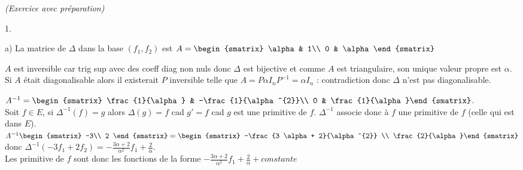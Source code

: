 \documentclass[11pt]{article}%
\begin{document}
\begin{exercice}{\it (Exercice avec préparation)}
\begin{noliste}{1.}
\begin{noliste}{a)}
 La matrice de $\Delta$ dans la base $(f_{1},f_{2})$ est $A =
\begin{smatrix}
\alpha & 1\\
0 & \alpha
\end{smatrix}
$
 \item $A$ est inversible car trig sup avec des coeff diag non nuls
donc $\Delta$ est bijective et comme $A$ est triangulaire, son unique
valeur propre est $\alpha$. \\
 Si $A$ était diagonalisable alors il existerait $P$ inversible telle
que $A = P \alpha I_{n} P^{-1} = \alpha I_{n}$ : contradiction donc
$\Delta$ n'est pas diagonalisable.
 \end{noliste}
 \item $A^{-1} = \begin{smatrix}
\frac{1}{\alpha} & -\frac{1}{\alpha^{2}}\\
0 & \frac{1}{\alpha}\end{smatrix}
$.\\
 Soit $f \in E$, si $\Delta^{-1}(f) = g$ alors $\Delta(g) = f$ cad $g'
= f$ cad $g$ est une primitive de $f$. $\Delta^{-1}$ associe donc à $f$
une primitive de $f$ (celle qui est dans $E$). \\
 $A^{-1} \begin{smatrix}
-3\\
2
\end{smatrix}
 = \begin{smatrix}
-\frac{3
 \alpha + 2}{\alpha^{2}} \\
\frac{2}{\alpha}\end{smatrix}
$ donc $\Delta^{-1}(-3f_{1} + 2f_{2}) = -\frac{3
 \alpha + 2}{\alpha^{2}}f_{1} + \frac{2}{\alpha}$. \\
 Les primitive de $f$ sont donc les fonctions de la forme $-\frac{3
\alpha + 2}{\alpha^{2}}f_{1} + \frac{2}{\alpha} + constante$
 \item{}
\end{noliste}
\end{exercice}
\end{document}
